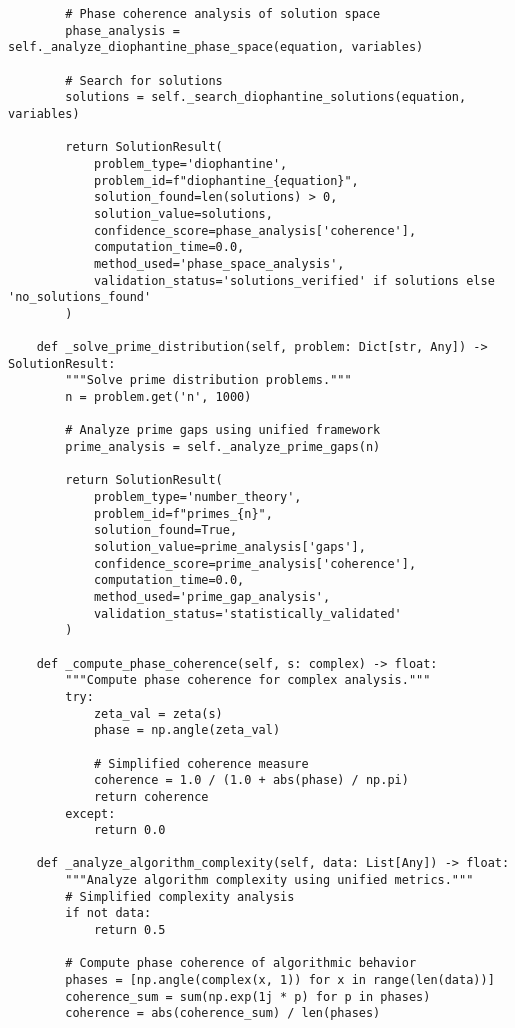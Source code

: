 \documentclass[12pt]{article}
\begin{document}
\begin{lstlisting}
        # Phase coherence analysis of solution space
        phase_analysis = self._analyze_diophantine_phase_space(equation, variables)

        # Search for solutions
        solutions = self._search_diophantine_solutions(equation, variables)

        return SolutionResult(
            problem_type='diophantine',
            problem_id=f"diophantine_{equation}",
            solution_found=len(solutions) > 0,
            solution_value=solutions,
            confidence_score=phase_analysis['coherence'],
            computation_time=0.0,
            method_used='phase_space_analysis',
            validation_status='solutions_verified' if solutions else 'no_solutions_found'
        )

    def _solve_prime_distribution(self, problem: Dict[str, Any]) -> SolutionResult:
        """Solve prime distribution problems."""
        n = problem.get('n', 1000)

        # Analyze prime gaps using unified framework
        prime_analysis = self._analyze_prime_gaps(n)

        return SolutionResult(
            problem_type='number_theory',
            problem_id=f"primes_{n}",
            solution_found=True,
            solution_value=prime_analysis['gaps'],
            confidence_score=prime_analysis['coherence'],
            computation_time=0.0,
            method_used='prime_gap_analysis',
            validation_status='statistically_validated'
        )

    def _compute_phase_coherence(self, s: complex) -> float:
        """Compute phase coherence for complex analysis."""
        try:
            zeta_val = zeta(s)
            phase = np.angle(zeta_val)

            # Simplified coherence measure
            coherence = 1.0 / (1.0 + abs(phase) / np.pi)
            return coherence
        except:
            return 0.0

    def _analyze_algorithm_complexity(self, data: List[Any]) -> float:
        """Analyze algorithm complexity using unified metrics."""
        # Simplified complexity analysis
        if not data:
            return 0.5

        # Compute phase coherence of algorithmic behavior
        phases = [np.angle(complex(x, 1)) for x in range(len(data))]
        coherence_sum = sum(np.exp(1j * p) for p in phases)
        coherence = abs(coherence_sum) / len(phases)


\end{lstlisting}
\end{document}
